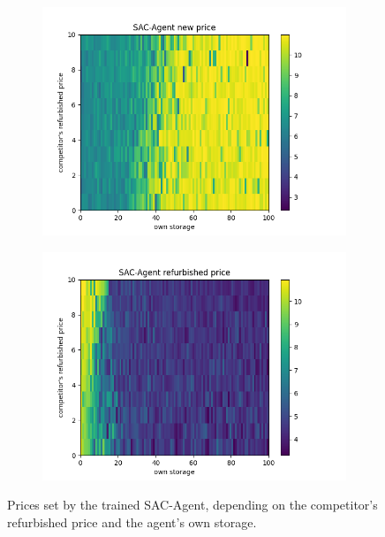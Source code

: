 \begin{figure}[b]
	\centering
	\begin{subfigure}{0.47\textwidth}
		\centering
		\includegraphics[width = \textwidth]{images/experiments/SACDuopoly/policyanalyzer/SACPolicyanalyzerNewPrice.png}\\
		\label{fig:PolicyanalyserSAC1}
	\end{subfigure}
	\begin{subfigure}{0.47\textwidth}
		\centering
		\includegraphics[width = \textwidth]{images/experiments/SACDuopoly/policyanalyzer/SACPolicyanalyzerRefurbishedPrice.png}\\
		\label{fig:PolicyanalyserSAC2}
	\end{subfigure}
	\caption{Prices set by the trained SAC-Agent, depending on the competitor's refurbished price and the agent's own storage.}\label{fig:PolicyanalyserSAC}
\end{figure}

